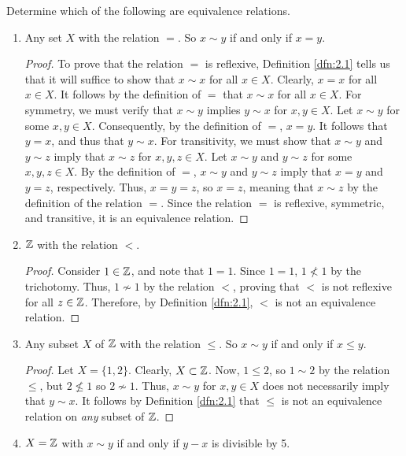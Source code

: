 \documentclass[../main.tex]{subfiles}
\begin{document}
\begin{exercise}\label{exr:2.2}
    Determine which of the following are equivalence relations.
    \begin{enumerate}[label={\alph*)},ref={\theexercise\alph*}]
        \item \label{exr:2.2a}Any set $X$ with the relation $=$. So $x\sim y$ if and only if $x=y$.
        \begin{proof}
            To prove that the relation $=$ is reflexive, Definition \ref{dfn:2.1} tells us that it will suffice to show that $x\sim x$ for all $x\in X$. Clearly, $x=x$ for all $x\in X$. It follows by the definition of $=$ that $x\sim x$ for all $x\in X$. For symmetry, we must verify that $x\sim y$ implies $y\sim x$ for $x,y\in X$. Let $x\sim y$ for some $x,y\in X$. Consequently, by the definition of $=$, $x=y$. It follows that $y=x$, and thus that $y\sim x$. For transitivity, we must show that $x\sim y$ and $y\sim z$ imply that $x\sim z$ for $x,y,z\in X$. Let $x\sim y$ and $y\sim z$ for some $x,y,z\in X$. By the definition of $=$, $x\sim y$ and $y\sim z$ imply that $x=y$ and $y=z$, respectively. Thus, $x=y=z$, so $x=z$, meaning that $x\sim z$ by the definition of the relation $=$. Since the relation $=$ is reflexive, symmetric, and transitive, it is an equivalence relation.
        \end{proof}
        \item \label{exr:2.2b}$\mathbb{Z}$ with the relation $<$.
        \begin{proof}
            Consider $1\in\mathbb{Z}$, and note that $1=1$. Since $1=1$, $1\nless 1$ by the trichotomy. Thus, $1\nsim 1$ by the relation $<$, proving that $<$ is not reflexive for all $z\in\mathbb{Z}$. Therefore, by Definition \ref{dfn:2.1}, $<$ is not an equivalence relation.
        \end{proof}
        \item \label{exr:2.2c}Any subset $X$ of $\mathbb{Z}$ with the relation $\leq$. So $x\sim y$ if and only if $x\leq y$.
        \begin{proof}
            Let $X=\{1,2\}$. Clearly, $X\subset\mathbb{Z}$. Now, $1\leq 2$, so $1\sim 2$ by the relation $\leq$, but $2\nleq 1$ so $2\nsim 1$. Thus, $x\sim y$ for $x,y\in X$ does not necessarily imply that $y\sim x$. It follows by Definition \ref{dfn:2.1} that $\leq$ is not an equivalence relation on \emph{any} subset of $\mathbb{Z}$.
        \end{proof}
        \item \label{exr:2.2d}$X=\mathbb{Z}$ with $x\sim y$ if and only if $y-x$ is divisible by 5.

\end{enumerate}
\end{exercise}
\end{document}
